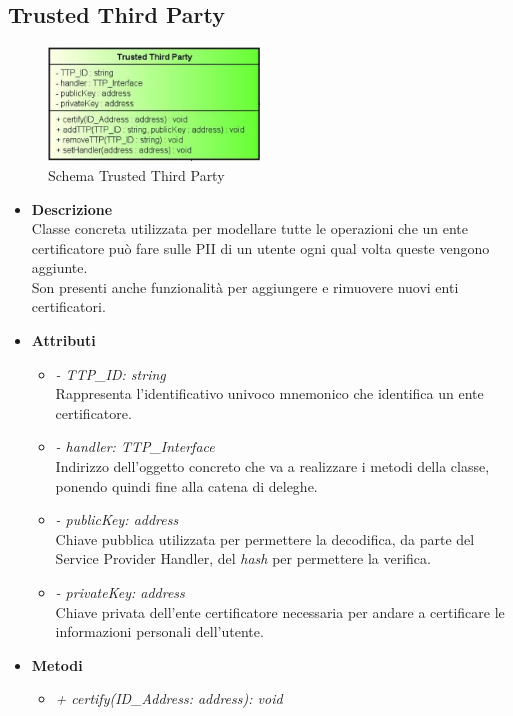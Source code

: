 \subsection{Trusted Third Party}
\begin{figure}[!h]
	\centering
	\includegraphics[width=0.5\textwidth]{immagini/ttpData}
	\caption{Schema Trusted Third Party}
\end{figure}
\begin{itemize}
	\item \textbf{Descrizione}\\
	Classe concreta utilizzata per modellare tutte le operazioni che un ente certificatore può fare sulle \gls{PII} di un utente ogni qual volta queste vengono aggiunte.\\
	Son presenti anche funzionalità per aggiungere e rimuovere nuovi enti certificatori.
	\item \textbf{Attributi}
	\begin{itemize}
		\item \textit{- TTP\_ID: string}\\
		Rappresenta l'identificativo univoco mnemonico che identifica un ente certificatore.
		\item \textit{- handler: TTP\_Interface}\\
		Indirizzo dell'oggetto concreto che va a realizzare i metodi della classe, ponendo quindi fine alla catena di deleghe.
		\item \textit{- publicKey: address}\\
		Chiave pubblica utilizzata per permettere la decodifica, da parte del Service Provider Handler, del \textit{hash} per permettere la verifica.
		\item \textit{- privateKey: address}\\
		Chiave privata dell'ente certificatore necessaria per andare a certificare le informazioni personali dell'utente.
	\end{itemize}
	\item \textbf{Metodi}
	\begin{itemize}
		\item \textit{+ certify(ID\_Address: address): void}\\

\end{itemize}
\end{itemize}
